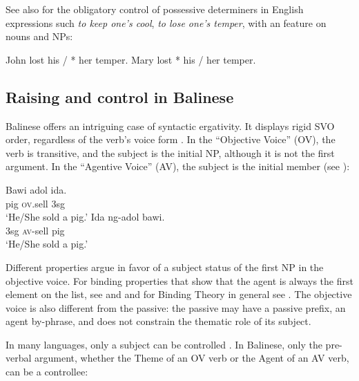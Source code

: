 \documentclass[output=paper
	        ,collection
	        ,collectionchapter
 	        ,biblatex
                ,babelshorthands
                ,newtxmath
                ,draftmode
                ,colorlinks, citecolor=brown
]{./langsci/langscibook}
\begin{document}
 See also \citet{SagKay2009} for the obligatory control of possessive determiners in English expressions such \emph{to keep one's cool}, \emph{to lose one's temper}, with an \xarg feature on nouns and NPs:
\begin{exe}
\ex \begin{xlist}
\ex John lost his / * her temper.
\ex Mary lost * his / her temper.
\end{xlist}
\end{exe}


\subsection{Raising and control in Balinese}
Balinese offers an intriguing case of syntactic ergativity. It displays rigid SVO order, regardless of the verb's voice form \citep{WechslerandArka1998}. In the ``Objective Voice'' (OV), the verb is transitive, and the subject is the initial NP, although it is not the first argument. In the ``Agentive Voice'' (AV), the subject is the \argst initial member (see ):

\begin{exe}
\ex \begin{xlist}
\ex \gll Bawi adol ida. \\
pig \textsc{ov}.sell 3sg \\
\glt `He/She sold a pig.' 
\ex  \gll Ida ng-adol bawi.\\
3sg \textsc{av}-sell pig\\
\glt `He/She sold a pig.'
\end{xlist}
\end{exe}

Different properties argue in favor of a subject status of the first NP in the objective voice. For
binding properties that show that the agent is always the first element on the \argst list, see
 and  and for Binding Theory in general see . The objective voice is also different from the passive: the passive may have a passive prefix, an agent by-phrase, and does not constrain the thematic role of its subject.

In many languages, only a subject
can be controlled \citep{Zaenenetal1985}. In Balinese, only the pre-verbal argument, whether the Theme of an OV verb or the Agent of an AV verb, can be a controllee:
\end{document}
